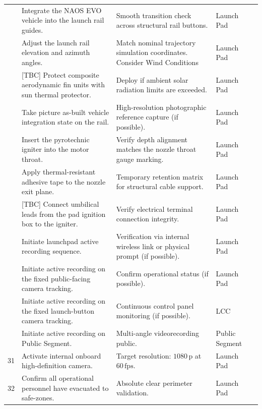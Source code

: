 \documentclass[11pt,a4paper]{article}
\begin{document}
\begin{xltabular}{\textwidth}{|>{\centering\arraybackslash}p{0.6cm}|X|X|>{\centering\arraybackslash}p{2.8cm}|>{\centering\arraybackslash}p{1.0cm}|}
     \\  & Integrate the NAOS EVO vehicle into the launch rail guides. & Smooth transition check across structural rail buttons. & Launch Pad & \\  & Adjust the launch rail elevation and azimuth angles. & Match nominal trajectory simulation coordinates.  Consider Wind Conditions& Launch Pad & \\  & [TBC] Protect composite aerodynamic fin units with sun thermal protector. & Deploy if ambient solar radiation limits are exceeded. & Launch Pad & \\  & Take picture as-built vehicle integration state on the rail. & High-resolution photographic reference capture (if possible). & Launch Pad & \\  & Insert the pyrotechnic igniter into the motor throat. & Verify depth alignment matches the nozzle throat gauge marking. & Launch Pad & \\  & Apply thermal-resistant adhesive tape to the nozzle exit plane. & Temporary retention matrix for structural cable support. & Launch Pad & \\  & [TBC] Connect umbilical leads from the pad ignition box to the igniter. & Verify electrical terminal connection integrity. & Launch Pad & \\  & Initiate launchpad active recording sequence. & Verification via internal wireless link or physical prompt (if possible). & Launch Pad & \\  & Initiate active recording on the fixed public-facing camera tracking. & Confirm operational status (if possible). & Launch Pad & \\  & Initiate active recording on the fixed launch-button camera tracking. & Continuous control panel monitoring (if possible). & LCC & \\  & Initiate active recording on Public Segment. & Multi-angle videorecording public. & Public Segment & \\ \hline
    31 & Activate internal onboard high-definition camera. & Target resolution: $1080\,\text{p}$ at $60\,\text{fps}$. & Launch Pad & \\ \hline
    32 & Confirm all operational personnel have evacuated to safe-zones. & Absolute clear perimeter validation. & Launch Pad & \\ \hline

\end{xltabular}
\end{document}
